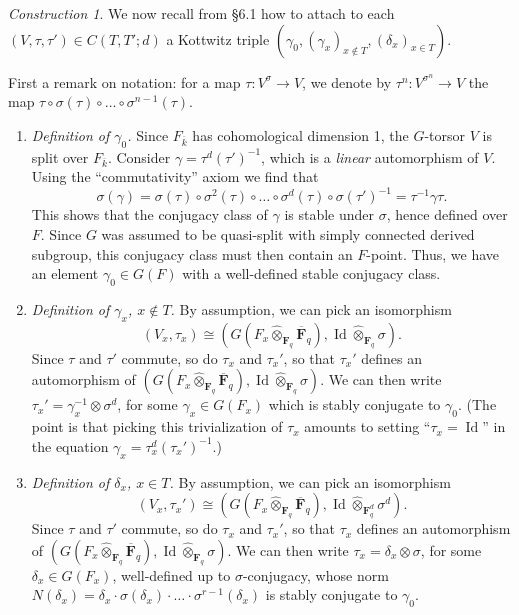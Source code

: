 \documentclass[reqno]{amsart}
\numberwithin{equation}{section}
\newcommand{\F}{\mathbf{F}}
\newcommand{\ol}[1]{\overline{#1}}
\newcommand{\wh}[1]{\widehat{#1}}
\newcommand{\co}{\colon}
\DeclareMathOperator{\Id}{Id}
\theoremstyle{remark}
\newtheorem{const}[thm]{Construction}
\numberwithin{equation}{section}
\begin{document}
\begin{const}\label{construction of Kottwitz triple} We now recall from \cite{NgoNgo} \S 6.1 how to attach to each $(V, \tau, \tau') \in C(T,T'; d)$ a Kottwitz triple $(\gamma_0, (\gamma_x)_{x \notin T}, (\delta_x)_{x \in T})$. 


 First a remark on notation: for a map $\tau \co V^{\sigma} \rightarrow V$, we denote by $\tau^n \co V^{\sigma^n} \rightarrow V$ the map $\tau  \circ \sigma(\tau) \circ \ldots \circ \sigma^{n-1}(\tau)$. 


\begin{enumerate}
\item \emph{Definition of $\gamma_0$.} Since $F_{\ol{k}}$ has cohomological dimension 1, the $G$-torsor $V$ is split over $F_{\ol{k}}$. Consider $\gamma =  \tau^d (\tau')^{-1}$, which is a \emph{linear} automorphism of $V$. Using the  ``commutativity'' axiom we find that
\[
\sigma(\gamma) = \sigma(\tau) \circ \sigma^2(\tau) \circ \ldots \circ \sigma^d(\tau) \circ \sigma(\tau')^{-1} = \tau^{-1} \gamma \tau.
\]
This shows that the conjugacy class of $\gamma$ is stable under $\sigma$, hence defined over $F$. Since $G$ was assumed to be quasi-split with simply connected derived subgroup, this conjugacy class must then contain an $F$-point. Thus, we have an element $\gamma_0 \in G(F)$ with a well-defined stable conjugacy class. \\

\item \emph{Definition of $\gamma_x$, $x \notin T$.} By assumption, we can pick an isomorphism 
\[
(V_x, \tau_x) \cong (G(F_x \wh{\otimes}_{\F_q} \ol{\F}_q), \Id \wh{\otimes}_{\F_q} \sigma).
\]
Since $\tau$ and $\tau'$ commute, so do $\tau_x$ and $\tau_x'$, so that $\tau_x'$ defines an automorphism of $(G(F_x \wh{\otimes}_{\F_q} \ol{\F}_q), \Id \wh{\otimes}_{\F_q} \sigma)$. We can then write $\tau_{x}' = \gamma_x^{-1} \otimes \sigma^d$, for some $\gamma_x \in G(F_x)$ which is stably conjugate to $\gamma_0$. (The point is that picking this trivialization of $\tau_x$ amounts to setting ``$\tau_x =\Id $'' in the equation $\gamma_x = \tau_x^d (\tau_x')^{-1}$.) 

\item \emph{Definition of $\delta_x$, $x \in T$.} By assumption, we can pick an isomorphism 
\[
(V_x, \tau_x') \cong (G(F_x \wh{\otimes}_{\F_q} \ol{\F}_q), \Id \wh{\otimes}_{\F_q^d} \sigma^d).
\]
Since $\tau$ and $\tau'$ commute, so do $\tau_x$ and $\tau_x'$, so that $\tau_x$ defines an automorphism of $(G(F_x \wh{\otimes}_{\F_q} \ol{\F}_q), \Id \wh{\otimes}_{\F_q} \sigma)$. We can then write $\tau_{x} =  \delta_x \otimes \sigma$, for some $\delta_x \in G(F_x)$, well-defined up to $\sigma$-conjugacy, whose norm $N(\delta_x)  =  \delta_x  \cdot \sigma( \delta_x) \cdot \ldots \cdot \sigma^{r-1}(  \delta_x)$ is stably conjugate to $\gamma_0$. 

\end{enumerate}
\end{const}
\end{document}
